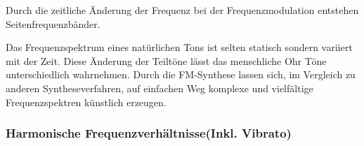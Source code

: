 Durch die zeitliche Änderung der Frequenz bei der Frequenzmodulation entstehen Seitenfrequenzbänder.


Das Frequenzspektrum eines natürlichen Tons ist selten statisch sondern variiert mit der Zeit. Diese Änderung der Teiltöne lässt das menschliche Ohr Töne unterschiedlich wahrnehmen. Durch die FM-Synthese lassen sich, im Vergleich zu anderen Syntheseverfahren, auf einfachen Weg komplexe und vielfältige Frequenzspektren künstlich erzeugen.

\FloatBarrier
\subsubsection{Harmonische Frequenzverhältnisse(Inkl. Vibrato)}


\FloatBarrier